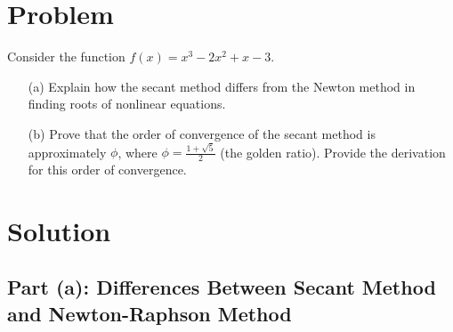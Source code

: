 \documentclass[12pt]{article}
\begin{document}
\section*{Problem}

Consider the function \( f(x) = x^3 - 2x^2 + x - 3 \).

\begin{enumerate}
    \item[(a)] Explain how the secant method differs from the Newton method in finding roots of nonlinear equations.
    
    \item[(b)] Prove that the order of convergence of the secant method is approximately \( \phi \), where \( \phi = \frac{1 + \sqrt{5}}{2} \) (the golden ratio). Provide the derivation for this order of convergence.
\end{enumerate}

\section*{Solution}

\subsection*{Part (a): Differences Between Secant Method and Newton-Raphson Method}
\end{document}
